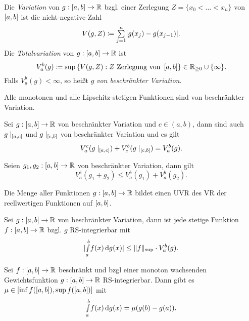 \documentclass{cheat-sheet}
\begin{document}
\begin{defn}
Die \emph{Variation} von $g : \left[ a, b \right] \to \mathbb{R}$ bzgl. einer Zerlegung $Z = \{ x_0 < ... < x_n \}$ von $\left[ a, b \right]$ ist die nicht-negative Zahl
\[ V(g, Z) \coloneqq \sum_{j=1}^{n} \abs{g(x_j) - g(x_{j-1})}. \]
Die \emph{Totalvariation} von $g : \left[ a, b \right] \to \mathbb{R}$ ist
\[ V_a^b(g) \coloneqq \sup\left\{ V(g, Z) : Z \text{ Zerlegung von } \left[ a, b \right] \right\} \in \mathbb{R}_{\ge 0} \cup \{ \infty \}. \]
Falls $V_a^b(g) < \infty$, so heißt $g$ \emph{von beschränkter Variation}.
\end{defn}

\begin{satz}
Alle monotonen und alle Lipschitz-stetigen Funktionen sind von beschränkter Variation.
\end{satz}

\begin{satz}
Sei $g : \left[ a, b \right] \to \mathbb{R}$ von beschränkter Variation und $c \in (a, b)$, dann sind auch $g\mid_{\left[ a, c \right]}$ und $g\mid_{\left[ c, b \right]}$ von beschränkter Variation und es gilt
\[ V_a^c(g\mid_{\left[ a, c \right]}) + V_c^b(g\mid_{\left[ c, b \right]}) = V_a^b(g). \]
\end{satz}

\begin{satz}
Seien $g_1, g_2 : \left[ a, b \right] \to \mathbb{R}$ von beschränkter Variation, dann gilt
\[ V_a^b(g_1 + g_2) \le V_a^b(g_1) + V_a^b(g_2). \]
\end{satz}

\begin{satz}
Die Menge aller Funktionen $g : \left[ a, b \right] \to \mathbb{R}$ bildet einen UVR des VR der reellwertigen Funktionen auf $\left[ a, b \right]$.
\end{satz}

\begin{satz}
Sei $g : \left[ a, b \right] \to \mathbb{R}$ von beschränkter Variation, dann ist jede stetige Funktion $f : \left[ a, b \right] \to \mathbb{R}$ bzgl. $g$ RS-integrierbar mit
\[ \lvert{\textstyle \int\limits_{a}^{b}} f(x) \,\mathrm{d} g(x)\rvert \le \lVert f\rVert_{\sup} \cdot V_a^b(g). \]
\end{satz}

\begin{satz}
Sei $f : \left[ a, b \right] \to \mathbb{R}$ beschränkt und bzgl einer monoton wachsenden Gewichtsfunktion $g : \left[ a, b \right] \to \mathbb{R}$ RS-integrierbar. Dann gibt es $\mu \in \left[ \inf f(\left[ a, b \right]), \sup f(\left[ a, b \right]) \right]$ mit
\[ {\textstyle \int\limits_{a}^{b}} f(x) \,\mathrm{d} g(x) = \mu(g(b) - g(a)). \]
\end{satz}
\end{document}
